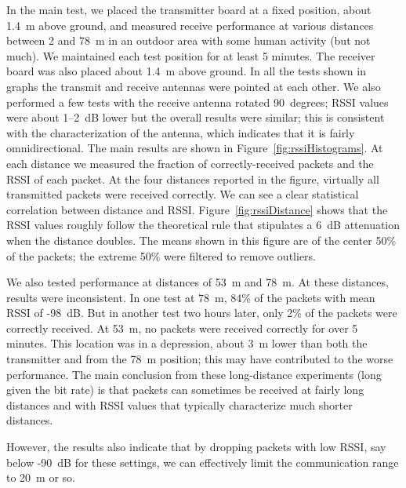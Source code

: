 In the main test, we placed the transmitter board at a fixed position, about 1.4~m above ground, and measured receive
performance at various distances between 2 and 78~m in an outdoor area with some human activity (but not much). We 
maintained each test position for at least 5 minutes.
The receiver board was also placed about 1.4~m above ground. In all the tests shown in graphs the transmit
and receive antennas were pointed at each other. We also performed a few tests with the receive antenna rotated 90~degrees;
RSSI values were about 1--2~dB lower but the overall results were similar; this is consistent with the characterization
of the antenna, which indicates that it is fairly omnidirectional.
The main results are shown in Figure~\ref{fig:rssiHistograms}.
At each distance we measured the fraction of correctly-received packets and the RSSI of each packet. At the four
distances reported in the figure, virtually all transmitted packets were received correctly. We can see a clear
statistical correlation between distance and RSSI. Figure~\ref{fig:rssiDistance} shows that the RSSI values
roughly follow the theoretical rule that stipulates a 6~dB attenuation when the distance doubles. The means
shown in this figure are of the center 50\% of the packets; the extreme 50\% were filtered to remove outliers.

We also tested performance at distances of 53~m and 78~m. At these distances, results were inconsistent. In one test
at 78~m, 84\% of the packets with mean RSSI of -98~dB. But in another test two hours later, only 2\% of the packets
were correctly received. At 53~m, no packets were received correctly for over 5 minutes. This location was in a depression,
about 3~m lower than both the transmitter and from the 78~m position; this may have contributed to the worse performance.
The main conclusion from these long-distance experiments (long given the bit rate) is that packets can sometimes be received
at fairly long distances and with RSSI values that typically characterize much shorter distances. 

However, the results also indicate that by dropping packets with low RSSI, say below -90~dB for these settings, we can
effectively limit the communication range to 20~m or so.
